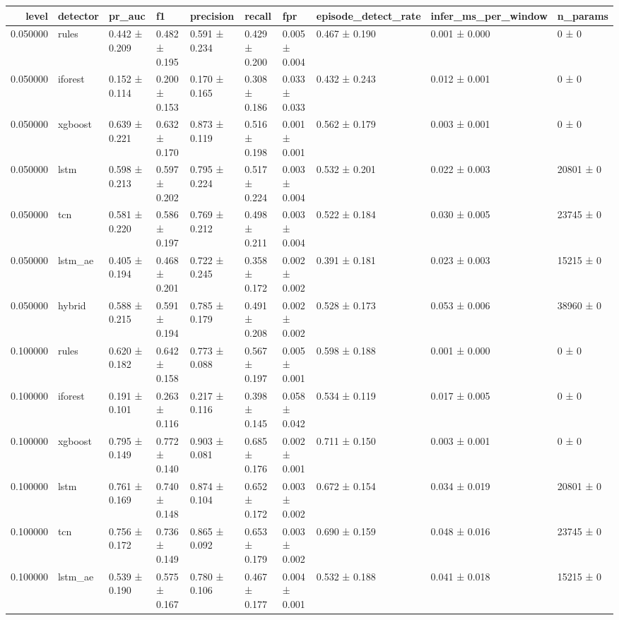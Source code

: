 \begin{tabular}{rlllllllll}
\toprule
level & detector & pr\_auc & f1 & precision & recall & fpr & episode\_detect\_rate & infer\_ms\_per\_window & n\_params \\
\midrule
0.050000 & rules & 0.442 ± 0.209 & 0.482 ± 0.195 & 0.591 ± 0.234 & 0.429 ± 0.200 & 0.005 ± 0.004 & 0.467 ± 0.190 & 0.001 ± 0.000 & 0 ± 0 \\
0.050000 & iforest & 0.152 ± 0.114 & 0.200 ± 0.153 & 0.170 ± 0.165 & 0.308 ± 0.186 & 0.033 ± 0.033 & 0.432 ± 0.243 & 0.012 ± 0.001 & 0 ± 0 \\
0.050000 & xgboost & 0.639 ± 0.221 & 0.632 ± 0.170 & 0.873 ± 0.119 & 0.516 ± 0.198 & 0.001 ± 0.001 & 0.562 ± 0.179 & 0.003 ± 0.001 & 0 ± 0 \\
0.050000 & lstm & 0.598 ± 0.213 & 0.597 ± 0.202 & 0.795 ± 0.224 & 0.517 ± 0.224 & 0.003 ± 0.004 & 0.532 ± 0.201 & 0.022 ± 0.003 & 20801 ± 0 \\
0.050000 & tcn & 0.581 ± 0.220 & 0.586 ± 0.197 & 0.769 ± 0.212 & 0.498 ± 0.211 & 0.003 ± 0.004 & 0.522 ± 0.184 & 0.030 ± 0.005 & 23745 ± 0 \\
0.050000 & lstm\_ae & 0.405 ± 0.194 & 0.468 ± 0.201 & 0.722 ± 0.245 & 0.358 ± 0.172 & 0.002 ± 0.002 & 0.391 ± 0.181 & 0.023 ± 0.003 & 15215 ± 0 \\
0.050000 & hybrid & 0.588 ± 0.215 & 0.591 ± 0.194 & 0.785 ± 0.179 & 0.491 ± 0.208 & 0.002 ± 0.002 & 0.528 ± 0.173 & 0.053 ± 0.006 & 38960 ± 0 \\
0.100000 & rules & 0.620 ± 0.182 & 0.642 ± 0.158 & 0.773 ± 0.088 & 0.567 ± 0.197 & 0.005 ± 0.001 & 0.598 ± 0.188 & 0.001 ± 0.000 & 0 ± 0 \\
0.100000 & iforest & 0.191 ± 0.101 & 0.263 ± 0.116 & 0.217 ± 0.116 & 0.398 ± 0.145 & 0.058 ± 0.042 & 0.534 ± 0.119 & 0.017 ± 0.005 & 0 ± 0 \\
0.100000 & xgboost & 0.795 ± 0.149 & 0.772 ± 0.140 & 0.903 ± 0.081 & 0.685 ± 0.176 & 0.002 ± 0.001 & 0.711 ± 0.150 & 0.003 ± 0.001 & 0 ± 0 \\
0.100000 & lstm & 0.761 ± 0.169 & 0.740 ± 0.148 & 0.874 ± 0.104 & 0.652 ± 0.172 & 0.003 ± 0.002 & 0.672 ± 0.154 & 0.034 ± 0.019 & 20801 ± 0 \\
0.100000 & tcn & 0.756 ± 0.172 & 0.736 ± 0.149 & 0.865 ± 0.092 & 0.653 ± 0.179 & 0.003 ± 0.002 & 0.690 ± 0.159 & 0.048 ± 0.016 & 23745 ± 0 \\
0.100000 & lstm\_ae & 0.539 ± 0.190 & 0.575 ± 0.167 & 0.780 ± 0.106 & 0.467 ± 0.177 & 0.004 ± 0.001 & 0.532 ± 0.188 & 0.041 ± 0.018 & 15215 ± 0 \\

\end{tabular}
